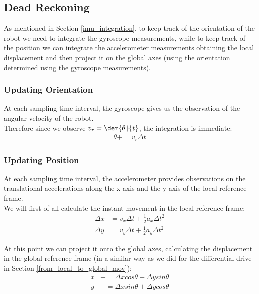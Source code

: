 \subsection{Dead Reckoning}

As mentioned in Section \ref{imu_integration}, to keep track of the orientation of the robot we need to integrate the gyroscope measurements, while to keep track of the position we can integrate the accelerometer measurements obtaining the local displacement and then project it on the global axes (using the orientation determined using the gyroscope measurements).

\subsubsection{Updating Orientation}

At each sampling time interval, the gyroscope gives us the observation of the angular velocity of the robot.\\
Therefore since we observe $v_r = \der{\theta}{t}$, the integration is immediate:
\begin{align}
	\theta += v_r \Delta t
\end{align}

\subsubsection{Updating Position}

At each sampling time interval, the accelerometer provides observations on the translational accelerations along the x-axis and the y-axis of the local reference frame.\\

We will first of all calculate the instant movement in the local reference frame:
\begin{align}
	\Delta x &= v_x \Delta t + \frac{1}{2} a_x \Delta t ^ 2\\
	\Delta y &= v_y \Delta t + \frac{1}{2} a_y \Delta t ^ 2
\end{align}

At this point we can project it onto the global axes, calculating the displacement in the global reference frame (in a similar way as we did for the differential drive in Section \ref{from_local_to_global_mov}):
\begin{align}
	x &+= \Delta x cos \theta - \Delta y sin \theta\\
	y &+= \Delta x sin \theta + \Delta y cos \theta
\end{align}

